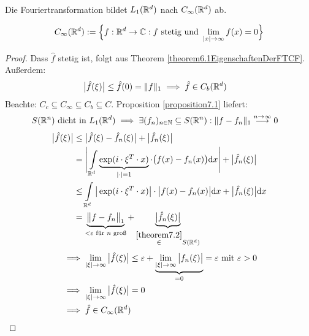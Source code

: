 \begin{korollar}\label{korollar7.3RiemanndLebesgue-Lemma}\enter
	Die Fouriertransformation bildet $L_1(\mathbb{R}^d)$ nach $C_\infty(\mathbb{R}^d)$ ab.
\end{korollar}

\begin{bemerkung}
	\begin{align*}
		C_\infty(\mathbb{R}^d):=\Big\lbrace f:\mathbb{R}^d\to\mathbb{C}: f\text{ stetig und }\lim\limits_{|x|\to\infty}f(x)=0\Big\rbrace
	\end{align*}
\end{bemerkung}

\begin{proof}
	Dass $\hat{f}$ stetig ist, folgt aus Theorem \ref{theorem6.1EigenschaftenDerFTCF}. Außerdem:
	\begin{align*}
		\big|\hat{f}(\xi)\big|
		&\leq\hat{f}(0)=\Vert f\Vert_1\implies\hat{f}\in C_b(\mathbb{R}^d)
	\end{align*}
	Beachte: $C_c\subseteq C_\infty\subseteq C_b\subseteq C$.
	Proposition \ref{proposition7.1} liefert:
	\begin{align*}
		S(\mathbb{R}^n)&\text{ dicht in }L_1(\mathbb{R}^d)\implies\exists(f_n)_{n\in\mathbb{N}}\subseteq S(\mathbb{R}^n):\Vert f-f_n\Vert_1\stackrel{n\to\infty}{\longrightarrow}0
	\end{align*}
	\begin{align*}
		\big|\hat{f}(\xi)\big|
		&\leq\big|\hat{f}(\xi)-\hat{f}_n(\xi)\big|+\big|\hat{f}_n(\xi)\big|\\
		&=\Bigg|\int\limits_{\mathbb{R}^d}\underbrace{\exp(i\cdot\xi^T\cdot x)}_{|\cdot|=1}\cdot\big(f(x)-f_n(x)\big)\mathrm{d} x\Bigg|+\big|\hat{f}_n(\xi)\big|\\
		&\leq
		\int\limits_{\mathbb{R}^d}\big|\exp(i\cdot\xi^T\cdot x)\big|\cdot\big|f(x)-f_n(x)\big|\mathrm{d} x+\big|\hat{f}_n(\xi)\big|\mathrm{d} x\\
		&=\underbrace{\big\Vert f-f_n\big\Vert_1}_{<\varepsilon\text{ für $n$ groß}}+\underbrace{\big|\hat{f}_n(\xi)\big|}_{\stackrel{\ref{theorem7.2}}{\in} S(\mathbb{R}^d)}
	\end{align*}
	\begin{align*}
		&\implies
		\lim\limits_{|\xi|\to\infty}\big|\hat{f}(\xi)\big|\leq\varepsilon+\underbrace{\lim\limits_{|\xi|\to\infty}\big|f_n(\xi)\big|}_{=0}=\varepsilon\text{ mit }			\varepsilon>0\\
		&\implies\lim\limits_{|\xi|\to\infty}\big|\hat{f}(\xi)\big|=0\\
		&\implies\hat{f}\in C_\infty(\mathbb{R}^d)
	\end{align*}
\end{proof}

